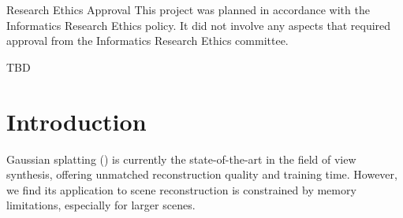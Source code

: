 \documentclass[logo,bsc,singlespacing,parskip]{infthesis}
\begin{document}
\begin{preliminary}
\newenvironment{ethics}
  {\begin{frontenv}{Research Ethics Approval}{\LARGE}}
  {\end{frontenv}\newpage}

\begin{ethics}
This project was planned in accordance with the Informatics Research
Ethics policy. It did not involve any aspects that required approval
from the Informatics Research Ethics committee.

\standarddeclaration
\end{ethics}


\begin{acknowledgements}
TBD
\end{acknowledgements}


\tableofcontents
\end{preliminary}


\chapter{Introduction}

Gaussian splatting (\cite{splat}) is currently the state-of-the-art in the field of view synthesis, offering unmatched reconstruction quality and training time. However, we find its application to scene reconstruction is constrained by memory limitations, especially for larger scenes.
\end{document}
